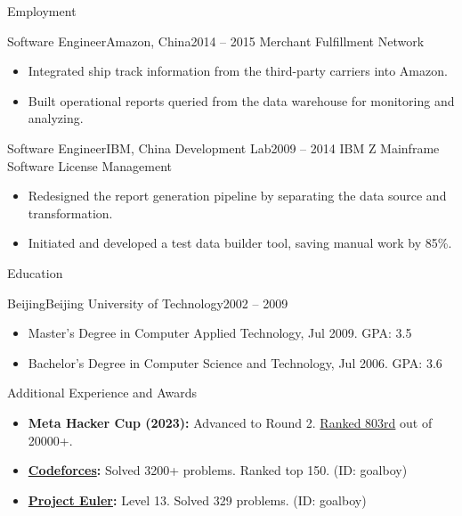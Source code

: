 \documentclass[]{mcdowellcv}
\begin{document}
\begin{cvsection}{Employment}
		\begin{cvsubsection}{Software Engineer}{Amazon, China}{2014 – 2015}
			Merchant Fulfillment Network
			\begin{itemize}
				\item Integrated ship track information from the third-party carriers into Amazon.
				\item Built operational reports queried from the data warehouse for monitoring and analyzing.
			\end{itemize}
		\end{cvsubsection}
		
		\begin{cvsubsection}{Software Engineer}{IBM, China Development Lab}{2009 – 2014}
			IBM Z Mainframe Software License Management
			\begin{itemize}
				\item Redesigned the report generation pipeline by separating the data source and transformation.
				\item Initiated and developed a test data builder tool, saving manual work by 85\%.
			\end{itemize}
		\end{cvsubsection}
	\end{cvsection}
	
	\begin{cvsection}{Education}
		\begin{cvsubsection}{Beijing}{Beijing University of Technology}{2002 – 2009}
			\begin{itemize}
				\item Master's Degree in Computer Applied Technology, Jul 2009. GPA: 3.5
				\item Bachelor's Degree in Computer Science and Technology, Jul 2006. GPA: 3.6
			\end{itemize}
		\end{cvsubsection}
	\end{cvsection}
	
	\begin{cvsection}{Additional Experience and Awards}
		\begin{cvsubsection}{}{}{}
			\begin{itemize}
				\item \textbf{Meta Hacker Cup (2023):} Advanced to Round 2. {\href{https://charles-wangkai.github.io/certificates/certificate_meta_hacker_cup_2023.png}{Ranked 803rd}} out of 20000+.
				\item \textbf{\href{https://codeforces.com}{Codeforces}:} Solved 3200+ problems. Ranked top 150. (ID: goalboy)
				\item \textbf{\href{https://projecteuler.net}{Project Euler}:} Level 13. Solved 329 problems. (ID: goalboy)
			\end{itemize}
		\end{cvsubsection}
	\end{cvsection}
	
\end{document}
